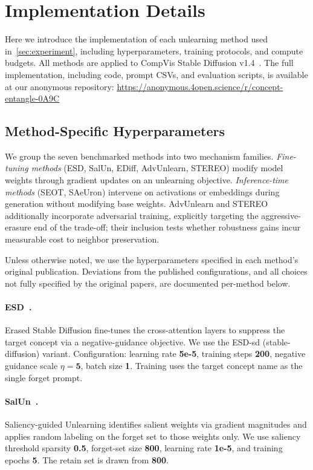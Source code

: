 \section{Implementation Details}
\label{app:implementation}
Here we introduce the implementation of each unlearning method used in~\cref{sec:experiment}, including hyperparameters, training protocols, and compute budgets. All methods are applied to CompVis Stable Diffusion v1.4~\citep{rombach2022high}. The full implementation, including code, prompt CSVs, and evaluation scripts, is available at our anonymous repository:
\url{https://anonymous.4open.science/r/concept-entangle-0A9C}

\subsection{Method-Specific Hyperparameters}
We group the seven benchmarked methods into two mechanism 
families. \emph{Fine-tuning methods} (ESD, SalUn, EDiff, 
AdvUnlearn, STEREO) modify model weights through gradient 
updates on an unlearning objective. \emph{Inference-time methods} (SEOT, SAeUron) intervene on activations or embeddings during generation without modifying base weights. AdvUnlearn and STEREO additionally incorporate adversarial training, explicitly targeting the aggressive-erasure end of the trade-off; their inclusion tests whether robustness gains incur measurable cost to neighbor preservation.

Unless otherwise noted, we use the hyperparameters specified in each method's original publication. Deviations from the published configurations, and all choices not fully specified by the original 
papers, are documented per-method below.
\paragraph{ESD~\citep{gandikota2023erasing}.} 
Erased Stable Diffusion fine-tunes the cross-attention 
layers to suppress the target concept via a negative-guidance objective. We use the ESD-sd (stable-diffusion) variant. 
Configuration: learning rate \textbf{5e-5}, training steps \textbf{200}, negative guidance scale $\eta = \textbf{5}$, 
batch size \textbf{1}. Training uses the target concept name as the single forget prompt.

\paragraph{SalUn~\citep{fan2023salun}.} 
Saliency-guided Unlearning identifies salient weights via gradient magnitudes and applies random labeling on the forget set to those weights only. We use saliency threshold sparsity \textbf{0.5}, forget-set size \textbf{800}, learning rate \textbf{1e-5}, and training epochs \textbf{5}. The retain set is drawn from \textbf{800}.
